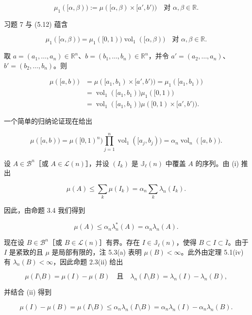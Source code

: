 \begin{theorem}
\begin{subitems}
\[
\mu_1([\alpha, \beta)) := \mu([\alpha, \beta) \times [a', b')) \quad \text{对 } \alpha, \beta \in \mathbb{R} .
\]

习题 7 与 (5.12) 蕴含

\[
\mu_1([\alpha, \beta)) = \mu_1([0, 1)) \operatorname{vol}_1([\alpha, \beta)) \quad \text{对 } \alpha, \beta \in \mathbb{R} .
\]

取 $ a = (a_1, \ldots, a_n) \in \mathbb{R}^n $、$ b = (b_1, \ldots, b_n) \in \mathbb{R}^n $，并令 $ a' = (a_2, \ldots, a_n) $、$ b' = (b_2, \ldots, b_n) $。则

\begin{equation*}
\begin{aligned}
\mu([a, b)) &= \mu([a_1, b_1) \times [a', b')) = \mu_1([a_1, b_1)) \\ &= \operatorname{vol}_1([a_1, b_1)) \mu_1([0, 1)) \\ &= \operatorname{vol}_1([a_1, b_1)) \mu([0, 1) \times [a', b')) .
\end{aligned}
\end{equation*}

一个简单的归纳论证现在给出

\[
\mu([a, b)) = \mu([0, 1)^n) \prod_{j=1}^{n} \operatorname{vol}_1([a_j, b_j)) = \alpha_n \operatorname{vol}_n([a, b)) .
\]
\item

设 $ A \in \mathcal{B}^n $［或 $ A \in \mathcal{L}(n) $］，并设 $ (I_k) $ 是 $ \mathbb{J}_\ell(n) $ 中覆盖 $ A $ 的序列。由 (i) 推出

\[
\mu(A) \le \sum_k \mu(I_k) = \alpha_n \sum_k \lambda_n(I_k) .
\]

因此，由命题 3.4 我们得到

\[
\mu(A) \le \alpha_n \lambda_n^{*}(A) = \alpha_n \lambda_n(A) .
\]
\item

现在设 $ B \in \mathcal{B}^n $［或 $ B \in \mathcal{L}(n) $］有界。存在 $ I \in \mathbb{J}_\ell(n) $，使得 $ B \subset I \subset \overline{I} $。由于 $ I $ 是紧致的且 $ \mu $ 是局部有限的，注 5.3(a) 表明 $ \mu(B) < \infty $。此外由定理 5.1(iv) 有 $ \lambda_n(B) < \infty $，因此命题 2.3(ii) 给出

\[
\mu(I \setminus B) = \mu(I) - \mu(B) \quad \text{且} \quad \lambda_n(I \setminus B) = \lambda_n(I) - \lambda_n(B) ,
\]

并结合 (ii) 得到

\[
\mu(I) - \mu(B) = \mu(I \setminus B) \le \alpha_n \lambda_n(I \setminus B) = \alpha_n \lambda_n(I) - \alpha_n \lambda_n(B) .
\]


\end{subitems}
\end{theorem}
